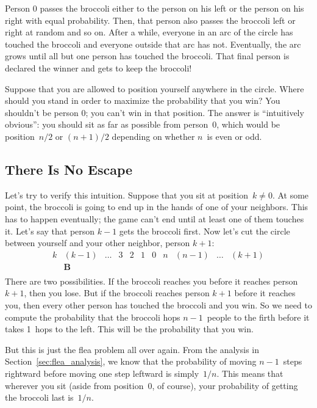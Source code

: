 Person 0 passes the broccoli either to the person on his left or the
person on his right with equal probability.  Then, that person also
passes the broccoli left or right at random and so on.  After a while,
everyone in an arc of the circle has touched the broccoli and everyone
outside that arc has not.  Eventually, the arc grows until all but one
person has touched the broccoli.  That final person is declared the
winner and gets to keep the broccoli!

Suppose that you are allowed to position yourself anywhere in the
circle.  Where should you stand in order to maximize the probability
that you win?  You shouldn't be person 0; you can't win in that
position.  The answer is ``intuitively obvious'': you should sit as
far as possible from person~0, which would be position~$n / 2$ or $(n
+ 1)/2$ depending on whether $n$~is even or odd.

\subsection{There Is No Escape}

Let's try to verify this intuition.  Suppose that you sit at
position~$k \neq 0$.  At some point, the broccoli is going to end up
in the hands of one of your neighbors.  This has to happen eventually;
the game can't end until at least one of them touches it.  Let's say
that person $k - 1$ gets the broccoli first.  Now let's cut the circle
between yourself and your other neighbor, person $k+1$:
%
\[
\begin{array}{cccccccccccccc}
k & (k-1) & \ldots & 3 & 2 & 1 & 0 & n & (n-1) & \ldots & (k+1) \\
  & \mathbf{B} \\
\end{array}
\]
%
There are two possibilities.  If the broccoli reaches you before it
reaches person $k+1$, then you lose.  But if the broccoli reaches
person $k+1$ before it reaches you, then every other person has
touched the broccoli and you win.  So we need to compute the
probability that the broccoli hops $n - 1$~people to the firth before
it takes 1~hops to the left.  This will  be the probability that you
win.

But this is just the flea problem all over again.  From the analysis in
Section~\ref{sec:flea_analysis}, we know that the probability of moving
$n - 1$~steps rightward before moving one step leftward is
simply~$1/n$.  This means that wherever you sit (aside from
position~0, of course), your probability of getting the broccoli last
is~$1/n$.

